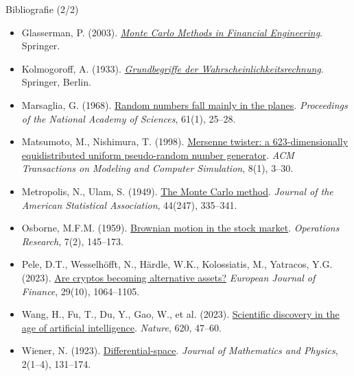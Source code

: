 \begin{frame}{Bibliografie (2/2)}
\itemsize{\tiny}
\begin{itemize}
    \item Glasserman, P. (2003). \href{https://doi.org/10.1007/978-0-387-21617-1}{\textit{Monte Carlo Methods in Financial Engineering}}. Springer.
    \item Kolmogoroff, A. (1933). \href{https://doi.org/10.1007/978-3-642-49888-6}{\textit{Grundbegriffe der Wahrscheinlichkeitsrechnung}}. Springer, Berlin.
    \item Marsaglia, G. (1968). \href{https://doi.org/10.1073/pnas.61.1.25}{Random numbers fall mainly in the planes}. \textit{Proceedings of the National Academy of Sciences}, 61(1), 25--28.
    \item Matsumoto, M., Nishimura, T. (1998). \href{https://doi.org/10.1145/272991.272995}{Mersenne twister: a 623-dimensionally equidistributed uniform pseudo-random number generator}. \textit{ACM Transactions on Modeling and Computer Simulation}, 8(1), 3--30.
    \item Metropolis, N., Ulam, S. (1949). \href{https://doi.org/10.1080/01621459.1949.10483310}{The Monte Carlo method}. \textit{Journal of the American Statistical Association}, 44(247), 335--341.
    \item Osborne, M.F.M. (1959). \href{https://doi.org/10.1287/opre.7.2.145}{Brownian motion in the stock market}. \textit{Operations Research}, 7(2), 145--173.
    \item Pele, D.T., Wesselhöfft, N., Härdle, W.K., Kolossiatis, M., Yatracos, Y.G. (2023). \href{https://doi.org/10.1080/1351847X.2021.1960403}{Are cryptos becoming alternative assets?} \textit{European Journal of Finance}, 29(10), 1064--1105.
    \item Wang, H., Fu, T., Du, Y., Gao, W., et al. (2023). \href{https://doi.org/10.1038/s41586-023-06221-2}{Scientific discovery in the age of artificial intelligence}. \textit{Nature}, 620, 47--60.
    \item Wiener, N. (1923). \href{https://doi.org/10.1002/sapm192321131}{Differential-space}. \textit{Journal of Mathematics and Physics}, 2(1--4), 131--174.
\end{itemize}
\end{frame}


